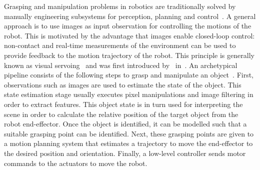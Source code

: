 \documentclass[\home/main.tex]{subfiles}
\begin{document}
Grasping and manipulation problems in robotics are traditionally solved by manually engineering subsystems for perception, planning and control~\autocite{Siciliano2008}. A general approach is to use images as input observation for controlling the motions of the robot. This is motivated by the advantage that images enable closed-loop control: non-contact and real-time measurements of the environment can be used to provide feedback to the motion trajectory of the robot. This principle is generally known as visual servoing~\autocite{Hutchinson1996} and was first introduced by~\citeauthor{Hill1979} in~\citeyear{Hill1979}. An archetypical pipeline consists of the following steps to grasp and manipulate an object~\autocite{Corke1996}. First, observations such as images are used to estimate the state of the object. This state estimation stage usually executes pixel manipulations and image filtering in order to extract features. This object state is in turn used for interpreting the scene in order to calculate the relative position of the target object from the robot end-effector. Once the object is identified, it can be modelled such that a suitable grasping point can be identified. Next, these grasping points are given to a motion planning system that estimates a trajectory to move the end-effector to the desired position and orientation. Finally, a low-level controller sends motor commands to the actuators to move the robot.
\end{document}
